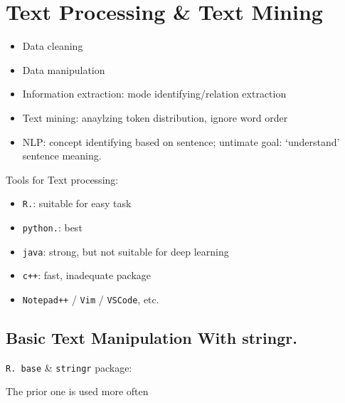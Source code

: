\section{Text Processing \& Text Mining}
    \begin{itemize}[topsep=2pt,itemsep=0pt]
        \item Data cleaning
        \item Data manipulation
        \item Information extraction: mode identifying/relation extraction
        \item Text mining: anaylzing token distribution, ignore word order
        \item NLP: concept identifying based on sentence; untimate goal: `understand' sentence meaning.
    \end{itemize}
    
    Tools for Text processing:
\begin{itemize}[topsep=2pt,itemsep=0pt]
    \item \lstinline|R.|: suitable for easy task 
    \item \lstinline|python.|: best
    \item \lstinline|java|: strong, but not suitable for deep learning
    \item \lstinline|c++|: fast, inadequate package
    \item \lstinline|Notepad++| / \lstinline|Vim| / \lstinline|VSCode|, etc.
\end{itemize}

    
        



\subsection{Basic Text Manipulation With stringr.}
\begin{point}
    \lstinline|R. base| \& \lstinline|stringr| package:
\end{point}

    The prior one is used more often

